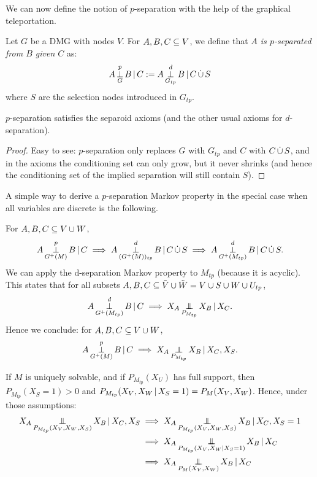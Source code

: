 We can now define the notion of $p$-separation with the help of the graphical teleportation.
\begin{Def}\label{def:p-separation}
  Let $G$ be a DMG with nodes $V$.
  For $A,B,C \subseteq V$, we define that \emph{$A$ is $p$-separated from $B$ given $C$} as:
  $$A \operatorname*{\perp}_{G}^p B \operatorname*{|} C := A \operatorname*{\perp}_{G_{tp}}^d B \operatorname*{|} C \,\dot{\cup}\, S$$
  where $S$ are the selection nodes introduced in $G_{tp}$.
\end{Def}
\begin{Prp}
  $p$-separation satisfies the separoid axioms (and the other usual axioms for $d$-separation).
\end{Prp}
\begin{proof}
  Easy to see: $p$-separation only replaces $G$ with $G_{tp}$ and $C$ with $C \,\dot{\cup}\, S$, and in the axioms the conditioning set can only grow, but it never shrinks (and hence the conditioning set of the implied separation will still contain $S$).
\end{proof}

\begin{Rem}
  A simple way to derive a $p$-separation Markov property in the special case when all variables are discrete is the following.
  
  For $A,B,C \subseteq V \cup W$,
  $$A \operatorname*{\perp}_{G^+(M)}^p B \operatorname*{|} C \implies A \operatorname*{\perp}_{(G^+(M))_{tp}}^d B \operatorname*{|} C \,\dot{\cup}\, S \implies A \operatorname*{\perp}_{G^+(M_{tp})}^d B \operatorname*{|} C \,\dot{\cup}\, S.$$
  We can apply the d-separation Markov property to $M_{tp}$ (because it is acyclic).
  This states that for all subsets $A,B,C \subseteq \tilde{V} \cup \tilde{W} = V \cup S \cup W \cup U_{tp}$,
  $$A \operatorname*{\perp}_{G^+(M_{tp})}^d B \operatorname*{|} C \implies X_A \operatorname*{\perp\mkern-11mu\perp}_{P_{M_{tp}}} X_B \operatorname*{|} X_C.$$
  Hence we conclude: for $A,B,C \subseteq V \cup W$,
  $$A \operatorname*{\perp}_{G^+(M)}^p B \operatorname*{|} C \implies X_A \operatorname*{\perp\mkern-11mu\perp}_{P_{M_{tp}}} X_B \operatorname*{|} X_C,X_S.$$

  If $M$ is uniquely solvable, and if $P_{M_{tp}}(X_U)$ has full support, then $P_{M_{tp}}(X_S=1) > 0$
  and $P_{M_{tp}}(X_V,X_W \operatorname*{|} X_S=1) = P_M(X_V,X_W)$.
  Hence, under those assumptions:
  \begin{align*}
    X_A \Indep_{P_{M_{tp}}(X_V,X_W,X_S)} X_B \given X_C,X_S 
    & \implies X_A \Indep_{P_{M_{tp}}(X_V,X_W,X_S)} X_B \given X_C,X_S=1 \\
    & \implies X_A \Indep_{P_{M_{tp}}(X_V,X_W|X_S=1)} X_B \given X_C \\
    & \implies X_A \Indep_{P_M(X_V,X_W)} X_B \given X_C
  \end{align*}
\end{Rem}

